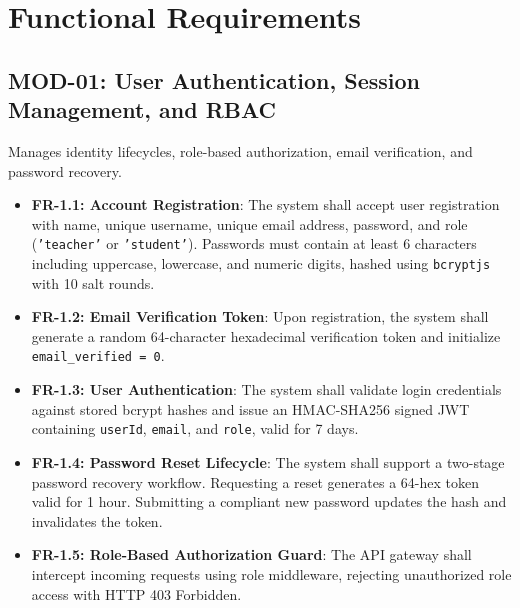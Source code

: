 \documentclass{scrreprt}
\begin{document}
\section{Functional Requirements}\label{sec:functional_requirements}

\subsection{MOD-01: User Authentication, Session Management, and RBAC}
Manages identity lifecycles, role-based authorization, email verification, and password recovery.
\begin{itemize}
    \item \textbf{FR-1.1: Account Registration}: The system shall accept user registration with name, unique username, unique email address, password, and role (\texttt{'teacher'} or \texttt{'student'}). Passwords must contain at least 6 characters including uppercase, lowercase, and numeric digits, hashed using \texttt{bcryptjs} with 10 salt rounds.
    \item \textbf{FR-1.2: Email Verification Token}: Upon registration, the system shall generate a random 64-character hexadecimal verification token and initialize \texttt{email\_verified = 0}.
    \item \textbf{FR-1.3: User Authentication}: The system shall validate login credentials against stored bcrypt hashes and issue an HMAC-SHA256 signed JWT containing \texttt{userId}, \texttt{email}, and \texttt{role}, valid for 7 days.
    \item \textbf{FR-1.4: Password Reset Lifecycle}: The system shall support a two-stage password recovery workflow. Requesting a reset generates a 64-hex token valid for 1 hour. Submitting a compliant new password updates the hash and invalidates the token.
    \item \textbf{FR-1.5: Role-Based Authorization Guard}: The API gateway shall intercept incoming requests using role middleware, rejecting unauthorized role access with HTTP 403 Forbidden.
\end{itemize}
\end{document}
